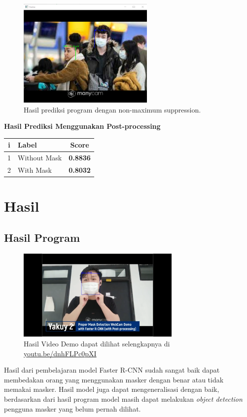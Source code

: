 \documentclass{article}
\begin{document}
	\begin{figure}[H]
		\centering
		\includegraphics[width=250px]{../demo/Results/implementation/with_nms0.png}
		\caption{Hasil prediksi program dengan non-maximum suppression.}
  	\end{figure}
	{\large{\textbf{Hasil Prediksi Menggunakan Post-processing}}}
	\begin{table}[H]
		\centering
		\begin{tabular}{clc}
			\hline
			\textbf{i} & \textbf{Label}               & \textbf{Score}  \\ \hline
			1 & Without Mask        & \textbf{0.8836} \\
			2 & With Mask           & \textbf{0.8032} \\
		\end{tabular}
	\end{table}

  \newpage
  \section{Hasil}
  
  \subsection{Hasil Program}
  \begin{figure}[H]
	\centering
	\includegraphics[width=300px]{./images/implementasi/thumbnail.png}
	\caption{Hasil Video Demo dapat dilihat selengkapnya di \href{https://youtu.be/dnhFLPc0pXI}{youtu.be/dnhFLPc0pXI}}
  \end{figure}
  \par Hasil dari pembelajaran model Faster R-CNN sudah sangat baik dapat membedakan orang yang menggunakan masker dengan benar atau tidak memakai masker. Hasil model juga dapat mengeneralisasi dengan baik, berdasarkan dari hasil program model masih dapat melakukan \textit{object detection} pengguna masker yang belum pernah dilihat. 
\end{document}
